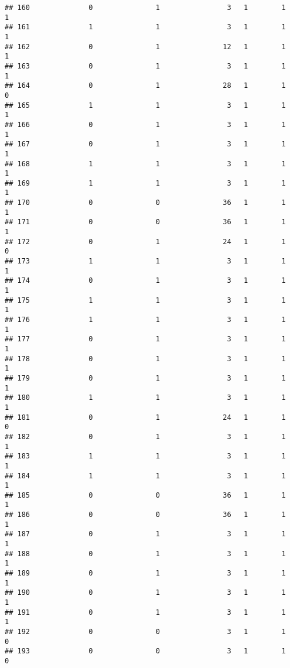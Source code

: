 \documentclass[]{article}
\begin{document}
\begin{verbatim}
## 160              0               1                3   1        1        1
## 161              1               1                3   1        1        1
## 162              0               1               12   1        1        1
## 163              0               1                3   1        1        1
## 164              0               1               28   1        1        0
## 165              1               1                3   1        1        1
## 166              0               1                3   1        1        1
## 167              0               1                3   1        1        1
## 168              1               1                3   1        1        1
## 169              1               1                3   1        1        1
## 170              0               0               36   1        1        1
## 171              0               0               36   1        1        1
## 172              0               1               24   1        1        0
## 173              1               1                3   1        1        1
## 174              0               1                3   1        1        1
## 175              1               1                3   1        1        1
## 176              1               1                3   1        1        1
## 177              0               1                3   1        1        1
## 178              0               1                3   1        1        1
## 179              0               1                3   1        1        1
## 180              1               1                3   1        1        1
## 181              0               1               24   1        1        0
## 182              0               1                3   1        1        1
## 183              1               1                3   1        1        1
## 184              1               1                3   1        1        1
## 185              0               0               36   1        1        1
## 186              0               0               36   1        1        1
## 187              0               1                3   1        1        1
## 188              0               1                3   1        1        1
## 189              0               1                3   1        1        1
## 190              0               1                3   1        1        1
## 191              0               1                3   1        1        1
## 192              0               0                3   1        1        0
## 193              0               0                3   1        1        0

\end{verbatim}
\end{document}
